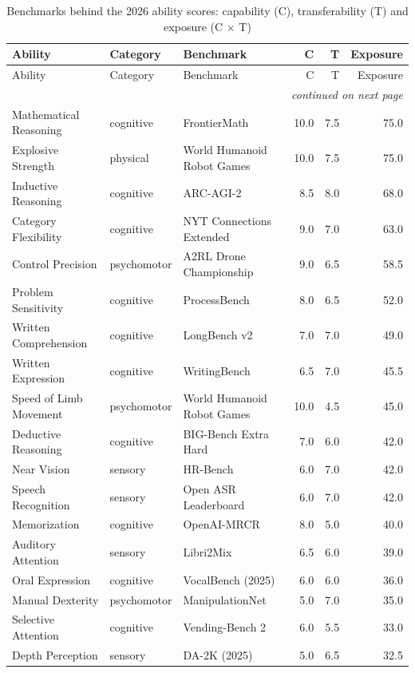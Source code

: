 \begin{longtable}{llp{5.2cm}rrr}
\caption{Benchmarks behind the 2026 ability scores: capability (C), transferability (T) and exposure (C $\times$ T)}\label{tab:benchmarks2026} \\ \toprule
Ability & Category & Benchmark & C & T & Exposure \\ \midrule \endfirsthead
\toprule Ability & Category & Benchmark & C & T & Exposure \\ \midrule \endhead
\midrule \multicolumn{6}{r}{\footnotesize\textit{continued on next page}} \\ \endfoot
\bottomrule \endlastfoot
Mathematical Reasoning & cognitive & FrontierMath & 10.0 & 7.5 & 75.0 \\
Explosive Strength & physical & World Humanoid Robot Games & 10.0 & 7.5 & 75.0 \\
Inductive Reasoning & cognitive & ARC-AGI-2 & 8.5 & 8.0 & 68.0 \\
Category Flexibility & cognitive & NYT Connections Extended & 9.0 & 7.0 & 63.0 \\
Control Precision & psychomotor & A2RL Drone Championship & 9.0 & 6.5 & 58.5 \\
Problem Sensitivity & cognitive & ProcessBench & 8.0 & 6.5 & 52.0 \\
Written Comprehension & cognitive & LongBench v2 & 7.0 & 7.0 & 49.0 \\
Written Expression & cognitive & WritingBench & 6.5 & 7.0 & 45.5 \\
Speed of Limb Movement & psychomotor & World Humanoid Robot Games & 10.0 & 4.5 & 45.0 \\
Deductive Reasoning & cognitive & BIG-Bench Extra Hard & 7.0 & 6.0 & 42.0 \\
Near Vision & sensory & HR-Bench & 6.0 & 7.0 & 42.0 \\
Speech Recognition & sensory & Open ASR Leaderboard & 6.0 & 7.0 & 42.0 \\
Memorization & cognitive & OpenAI-MRCR & 8.0 & 5.0 & 40.0 \\
Auditory Attention & sensory & Libri2Mix & 6.5 & 6.0 & 39.0 \\
Oral Expression & cognitive & VocalBench (2025) & 6.0 & 6.0 & 36.0 \\
Manual Dexterity & psychomotor & ManipulationNet & 5.0 & 7.0 & 35.0 \\
Selective Attention & cognitive & Vending-Bench 2 & 6.0 & 5.5 & 33.0 \\
Depth Perception & sensory & DA-2K (2025) & 5.0 & 6.5 & 32.5 \\

\end{longtable}
